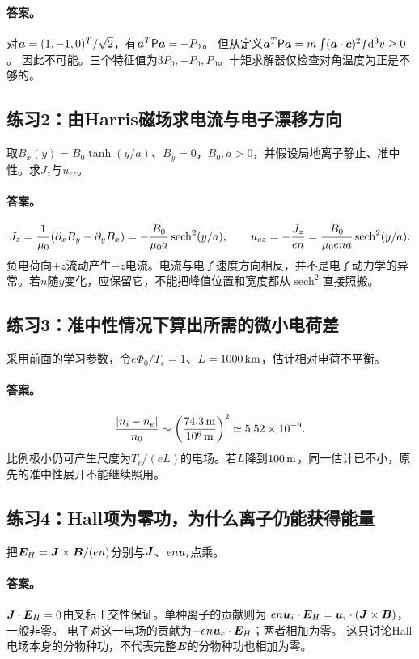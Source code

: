 \documentclass[UTF8,a4paper,11pt,openany,fontset=fandol]{ctexbook}
\begin{document}
\paragraph{答案。}
对$\bm{a}=(1,-1,0)^T/\sqrt2$，有$\bm{a}^T\mathsf P\bm{a}=-P_0$。
但从定义$\bm{a}^T\mathsf P\bm{a}=m\int(\bm{a}\cdot\bm{c})^2f\mathrm d^3v\ge0$。
因此不可能。三个特征值为$3P_0,-P_0,P_0$。十矩求解器仅检查对角温度为正是不够的。

\subsection{练习2：由Harris磁场求电流与电子漂移方向}
取$B_x(y)=B_0\tanh(y/a)$、$B_y=0$，$B_0,a>0$，并假设局地离子静止、准中性。求$J_z$与$u_{ez}$。
\paragraph{答案。}
\begin{equation}
 J_z={1\over\mu_0}(\partial_xB_y-\partial_yB_x)
 =-{B_0\over\mu_0a}\operatorname{sech}^2(y/a),\qquad
 u_{ez}=-{J_z\over en}
 ={B_0\over\mu_0ena}\operatorname{sech}^2(y/a).
\end{equation}
负电荷向$+z$流动产生$-z$电流。电流与电子速度方向相反，并不是电子动力学的异常。若$n$随$y$变化，应保留它，不能把峰值位置和宽度都从$\operatorname{sech}^2$直接照搬。

\subsection{练习3：准中性情况下算出所需的微小电荷差}
采用前面的学习参数，令$e\Phi_0/T_e=1$、$L=1000\,{\rm km}$，估计相对电荷不平衡。
\paragraph{答案。}
\begin{equation}
 {|n_i-n_e|\over n_0}\sim
 \left({74.3\,{\rm m}\over10^6\,{\rm m}}\right)^2
 \simeq5.52\times10^{-9}.
\end{equation}
比例极小仍可产生尺度为$T_e/(eL)$的电场。若$L$降到$100\,{\rm m}$，同一估计已不小，原先的准中性展开不能继续照用。

\subsection{练习4：Hall项为零功，为什么离子仍能获得能量}
把$\bm{E}_H=\bm{J}\times\bm{B}/(en)$分别与$\bm{J}$、$en\bm{u}_i$点乘。
\paragraph{答案。}
$\bm{J}\cdot\bm{E}_H=0$由叉积正交性保证。单种离子的贡献则为
$en\bm{u}_i\cdot\bm{E}_H=\bm{u}_i\cdot(\bm{J}\times\bm{B})$，一般非零。
电子对这一电场的贡献为$-en\bm{u}_e\cdot\bm{E}_H$；两者相加为零。
这只讨论Hall电场本身的分物种功，不代表完整$\bm{E}$的分物种功也相加为零。
\end{document}
